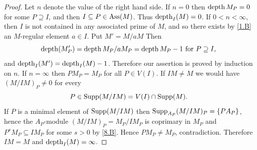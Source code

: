 \documentclass[../main]{subfiles}
\begin{document}
\begin{proof}
Let $n$ denote the value of the right hand side. If $n=0$ then $\operatorname{depth} M_P=0$ for some $P \supseteq I$, and then $I \subseteq P \in \operatorname{Ass} (M)$. Thus $\operatorname{depth}_I(M)=0$. If $0<n<\infty$, then $I$ is not contained in any associated prime of $M$, and so there exists by \ref{1.B} an $M$-regular element $a \in I$. Put $M'=M/aM$ Then \[\operatorname{depth}(M'_P)=\operatorname{depth} M_P / aM_P=\operatorname{depth} M_P-1\text{ for } P \supseteq I,\] and $\operatorname{depth}_I(M')=\operatorname{depth}_I(M)-1$. Therefore our assertion is proved by induction on $n$. If $n=\infty$ then $PM_{P}=M_P$ for all $P\in V(I)$. If $I M \neq M$ we would have $(M / I M)_P \neq 0$ for every \[P \in\operatorname{Supp}(M / I M)=V(I) \cap \operatorname{Supp}(M).\] If $P$ is a minimal element of $\operatorname{Supp}(M/IM)$ then $\operatorname{Supp}_{A_P}(M / IM)_{P}=\{PA_P\}$, hence the $A_P$-module $(M/IM)_P=M_P / I M_P$ is coprimary in $M_P$ and \newline $P^sM_P \subseteq IM_P$ for some $s>0$ by \ref{8.B}. Hence $PM_P \neq M_P$, contradiction. Therefore $IM=M$ and $\operatorname{depth}_I(M)=\infty$.
\end{proof}
\end{document}
